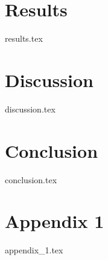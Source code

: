 \documentclass{article} %
\begin{document}
\section{Results}
\label{sec:results}
{results.tex}

\hypertarget{discussion}{%
\section{Discussion}\label{discussion}}
{discussion.tex}

\hypertarget{conclusion}{%
\section{Conclusion}\label{conclusion}}
{conclusion.tex}


\newpage




\newpage
\appendix %

\hypertarget{appendix1}{%
\section{Appendix 1}\label{appendix1}}
{appendix_1.tex}
\end{document}

